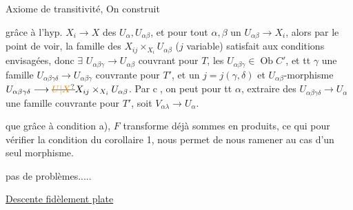 Axiome  de transitivité, On construit


grâce à l'hyp.  $X_i\longrightarrow X$  des $U_\alpha,U_{\alpha\beta}$, et pour tout $\alpha,\beta$ un $U_{\alpha\beta}\longrightarrow X_i$,  alors par le point  de voir, la famille des $X_{ij}\times_{X_i} U_{\alpha\beta}$ ($j$ variable) satisfait aux conditions envisagées, donc $\exists$ $U_{\alpha\beta\gamma}\longrightarrow U_{\alpha\beta}$ couvrant pour $T$, les $U_{\alpha\beta\gamma}\in\operatorname{Ob}C'$, et  tt $\gamma$ une famille $U_{\alpha\beta\gamma\delta}\longrightarrow U_{\alpha\beta\gamma}$ couvrante pour $T'$, et un $j=j(\gamma,\delta)$ et $U_{\alpha\beta}$-morphisme $U_{\alpha\beta\gamma\delta}\longrightarrow \deleted{\unsure{U|X}}X_{ij}\times_{X_i}U_{\alpha\beta}$. Par \textcircled{c}, on peut pour tt $\alpha$, extraire des $U_{\alpha\beta\gamma\delta}\longrightarrow U_\alpha$ une famille couvrante pour $T'$, soit $V_{\alpha\lambda}\longrightarrow U_\alpha$.



que grâce à condition a), $F$  transforme déjà sommes en produits, ce qui pour vérifier la condition  du corollaire 1, nous permet de nous ramener au cas d'un seul morphisme.

  pas de problèmes.....

\uline{Descente fidèlement plate}

